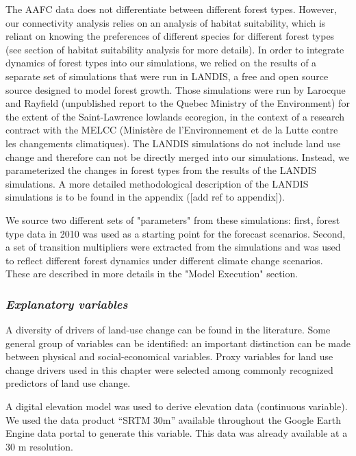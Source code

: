 The AAFC data does not differentiate between different forest types. However, our connectivity analysis relies on an analysis of habitat suitability, which is reliant on knowing the preferences of different species for different forest types (see section of habitat suitability analysis for more details). In order to integrate dynamics of forest types into our simulations, we relied on the results of a separate set of simulations that were run in LANDIS, a free and open source source designed to model forest growth. Those simulations were run by Larocque and Rayfield (unpublished report to the Quebec Ministry of the Environment) for the extent of the Saint-Lawrence lowlands ecoregion, in the context of a research contract with the MELCC (Ministère de l'Environnement et de la Lutte contre les changements climatiques). The LANDIS simulations do not include land use change and therefore can not be directly merged into our simulations. Instead, we parameterized the changes in forest types from the results of the LANDIS simulations. A more detailed methodological description of the LANDIS simulations is to be found in the appendix ([add ref to appendix]). %

We source two different sets of "parameters" from these simulations: first, forest type data in 2010 was used as a starting point for the forecast scenarios. Second, a set of transition multipliers were extracted from the simulations and was used to reflect different forest dynamics under different climate change scenarios. These are described in more details in the "Model Execution" section.\\

\subsubsection*{\textit{Explanatory variables}}

A diversity of drivers of land-use change can be found in the literature. Some general group of variables can be identified: an important distinction can be made between physical and social-economical variables. Proxy variables for land use change drivers used in this chapter were selected among commonly recognized predictors of land use change.

A digital elevation model was used to derive elevation data (continuous variable). We used the data product “SRTM 30m” available throughout the Google Earth Engine data portal to generate this variable. This data was already available at a 30 m resolution.


